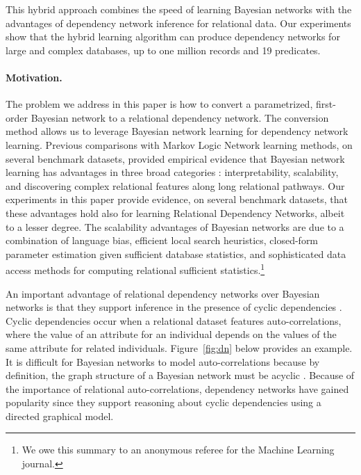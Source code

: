 \documentclass[runningheads,a4paper]{llncs}
\begin{document}
This hybrid approach combines the speed of learning Bayesian networks with the advantages of dependency network inference for relational data.
Our experiments show that the hybrid learning algorithm can produce dependency networks for large and complex databases, up to one million records and 19 predicates. 
%

\paragraph{Motivation.} The problem we address in this paper is how to convert a parametrized, first-order Bayesian network to a relational dependency network. The conversion method allows us to leverage Bayesian network learning for dependency network learning. 
Previous comparisons with Markov Logic Network learning methods, on several benchmark datasets, provided empirical evidence that Bayesian network learning has advantages in three broad categories \cite{Schulte2012,Khosravi2010,Friedman99prm}: interpretability, scalability, and discovering complex relational features along long relational pathways. Our experiments in this paper provide evidence, on several benchmark datasets, that these advantages hold also for learning Relational Dependency Networks, albeit to a lesser degree. The scalability advantages of Bayesian networks are due to a combination of language bias, efficient local search heuristics, closed-form parameter estimation given sufficient database statistics, and sophisticated data access methods for computing relational sufficient statistics.\footnote{We owe this summary to an anonymous referee for the Machine Learning journal.} 

An important advantage of relational dependency networks over Bayesian networks is that they support inference in the presence of cyclic dependencies \cite{Neville2007,Natarajan2012}. 
Cyclic dependencies occur when a relational dataset features auto-correlations, where the value of an attribute for an individual depends on the values of the same attribute for related individuals. Figure~\ref{fig:dn} below provides an example. It is difficult for Bayesian networks to model auto-correlations because by definition, the graph structure of a Bayesian network must be acyclic \cite{Domingos2007,Taskar2002,Getoorprm2001}. Because of the importance of relational auto-correlations, dependency networks have gained popularity since they support reasoning about cyclic dependencies using a directed graphical model. 
\end{document}
